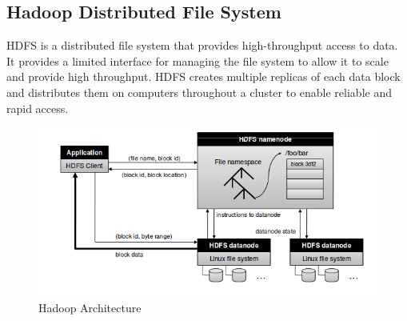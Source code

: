 \documentclass[12pt]{book}
\begin{document}
\subsection{Hadoop Distributed File System}
HDFS is a distributed file system that provides high-throughput access to data.
It provides a limited interface for managing the file system to allow it to scale and provide high throughput. 
HDFS creates multiple replicas of each data block and distributes them on computers throughout a cluster to enable reliable and rapid access.
\cite{Features}\\
\begin{figure}[hb]
 \centering
 \includegraphics[width=15cm]{./hadoop_archi.png}
 \caption{Hadoop Architecture \cite{PNC}}
\end{figure}
\end{document}
